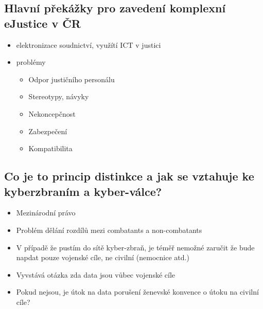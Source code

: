 \subsection{Hlavní překážky pro zavedení komplexní eJustice v ČR}
\begin{itemize}
    \item  elektronizace soudnictví, využítí ICT v justici
    \item problémy
    \begin{itemize}
        \item Odpor justičního personálu
        \item Stereotypy, návyky
        \item Nekoncepčnost
        \item Zabezpečení
        \item Kompatibilita

    \end{itemize}
\end{itemize}

\subsection{Co je to princip distinkce a jak se vztahuje ke kyberzbraním a kyber-válce?}
\begin{itemize}
    \item Mezinárodní právo
    \item Problém dělání rozdílů mezi combatants a non-combatants
    \item V případě že pustím do sítě kyber-zbraň, je téměř nemožné zaručit že bude napdat pouze vojenské cíle, ne civilní (nemocnice atd.)
    \item Vyvstává otázka zda data jsou vůbec vojenské cíle
    \item Pokud nejsou, je útok na data porušení ženevské konvence o útoku na civilní cíle?
    
\end{itemize}